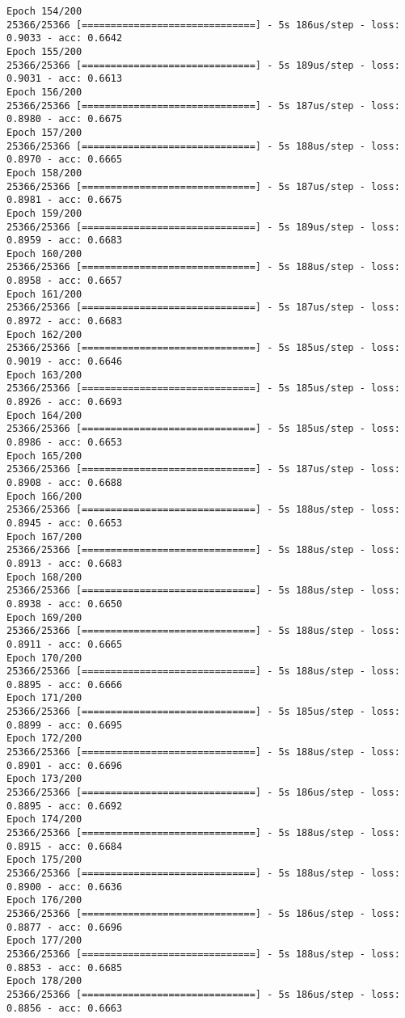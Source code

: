 \documentclass[11pt]{article}
\begin{document}
\begin{Verbatim}[commandchars=\\\{\}]
Epoch 154/200
25366/25366 [==============================] - 5s 186us/step - loss: 0.9033 - acc: 0.6642
Epoch 155/200
25366/25366 [==============================] - 5s 189us/step - loss: 0.9031 - acc: 0.6613
Epoch 156/200
25366/25366 [==============================] - 5s 187us/step - loss: 0.8980 - acc: 0.6675
Epoch 157/200
25366/25366 [==============================] - 5s 188us/step - loss: 0.8970 - acc: 0.6665
Epoch 158/200
25366/25366 [==============================] - 5s 187us/step - loss: 0.8981 - acc: 0.6675
Epoch 159/200
25366/25366 [==============================] - 5s 189us/step - loss: 0.8959 - acc: 0.6683
Epoch 160/200
25366/25366 [==============================] - 5s 188us/step - loss: 0.8958 - acc: 0.6657
Epoch 161/200
25366/25366 [==============================] - 5s 187us/step - loss: 0.8972 - acc: 0.6683
Epoch 162/200
25366/25366 [==============================] - 5s 185us/step - loss: 0.9019 - acc: 0.6646
Epoch 163/200
25366/25366 [==============================] - 5s 185us/step - loss: 0.8926 - acc: 0.6693
Epoch 164/200
25366/25366 [==============================] - 5s 185us/step - loss: 0.8986 - acc: 0.6653
Epoch 165/200
25366/25366 [==============================] - 5s 187us/step - loss: 0.8908 - acc: 0.6688
Epoch 166/200
25366/25366 [==============================] - 5s 188us/step - loss: 0.8945 - acc: 0.6653
Epoch 167/200
25366/25366 [==============================] - 5s 188us/step - loss: 0.8913 - acc: 0.6683
Epoch 168/200
25366/25366 [==============================] - 5s 188us/step - loss: 0.8938 - acc: 0.6650
Epoch 169/200
25366/25366 [==============================] - 5s 188us/step - loss: 0.8911 - acc: 0.6665
Epoch 170/200
25366/25366 [==============================] - 5s 188us/step - loss: 0.8895 - acc: 0.6666
Epoch 171/200
25366/25366 [==============================] - 5s 185us/step - loss: 0.8899 - acc: 0.6695
Epoch 172/200
25366/25366 [==============================] - 5s 188us/step - loss: 0.8901 - acc: 0.6696
Epoch 173/200
25366/25366 [==============================] - 5s 186us/step - loss: 0.8895 - acc: 0.6692
Epoch 174/200
25366/25366 [==============================] - 5s 188us/step - loss: 0.8915 - acc: 0.6684
Epoch 175/200
25366/25366 [==============================] - 5s 188us/step - loss: 0.8900 - acc: 0.6636
Epoch 176/200
25366/25366 [==============================] - 5s 186us/step - loss: 0.8877 - acc: 0.6696
Epoch 177/200
25366/25366 [==============================] - 5s 188us/step - loss: 0.8853 - acc: 0.6685
Epoch 178/200
25366/25366 [==============================] - 5s 186us/step - loss: 0.8856 - acc: 0.6663

\end{Verbatim}
\end{document}
